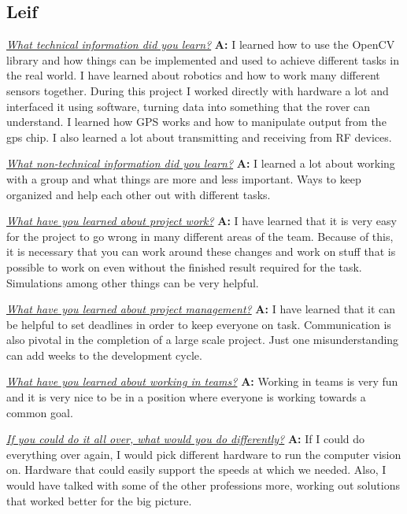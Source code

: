 \documentclass[onecolumn, draftclsnofoot, 10pt, compsoc]{IEEEtran}
\begin{document}
\subsection{Leif}
\textit{\underline{What technical information did you learn?}}
\newline\textbf{A:} I learned how to use the OpenCV library and how things can be implemented and used to achieve different tasks in the real world. I have learned about robotics and how to work many different sensors together. During this project I worked directly with hardware a lot and interfaced it using software, turning data into something that the rover can understand.  I learned how GPS works and how to manipulate output from the gps chip.  I also learned a lot about transmitting and receiving from RF devices. \newline 

\textit{\underline{What non-technical information did you learn?}}
\newline\textbf{A:} I learned a lot about working with a group and what things are more and less important. Ways to keep organized and help each other out with different tasks. \newline 

\textit{\underline{What have you learned about project work?}}
\newline\textbf{A:} I have learned that it is very easy for the project to go wrong in many different areas of the team. Because of this, it is necessary that you can work around these changes and work on stuff that is possible to work on even without the finished result required for the task. Simulations among other things can be very helpful. \newline 

\textit{\underline{What have you learned about project management?}}
\newline\textbf{A:} I have learned that it can be helpful to set deadlines in order to keep everyone on task. Communication is also pivotal in the completion of a large scale project. Just one misunderstanding can add weeks to the development cycle. \newline 

\textit{\underline{What have you learned about working in teams?}}
\newline\textbf{A:} Working in teams is very fun and it is very nice to be in a position where everyone is working towards a common goal. \newline 

\textit{\underline{If you could do it all over, what would you do differently?}}
\newline\textbf{A:} If I could do everything over again, I would pick different hardware to run the computer vision on. Hardware that could easily support the speeds at which we needed. Also, I would have talked with some of the other professions more, working out solutions that worked better for the big picture. \newline 
\end{document}
